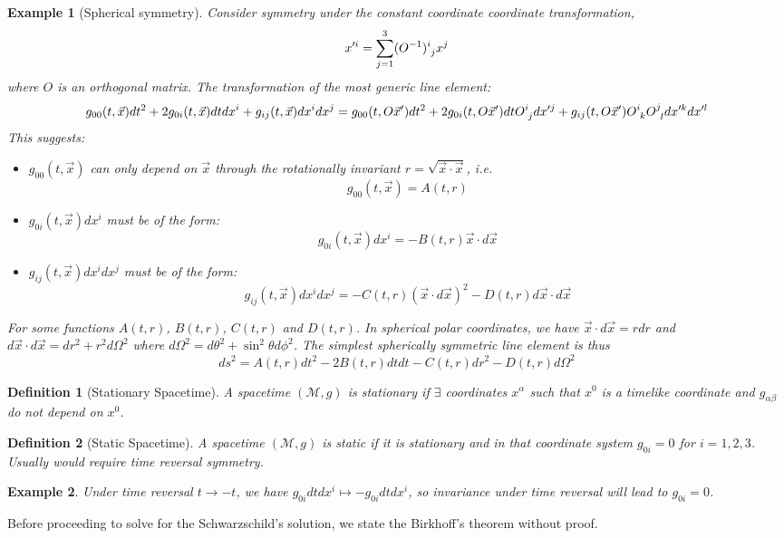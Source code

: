 \documentclass[a4paper]{article}
\newtheorem{eg}{Example}[section]
\theoremstyle{new}
\newtheorem{defi}{Definition}[section]
\begin{document}
\begin{eg}[Spherical symmetry]
Consider symmetry under the constant coordinate coordinate transformation,
$$x'^i=\sum_{j=1}^3\tensor*{(O^{-1})}{*_{}^{i}_{j}}x^j$$
where $O$ is an orthogonal matrix. The transformation of the most generic line element:
$$g_{00}(t,\vec{x})dt^2+2g_{0i}(t,\vec{x})dt dx^i+g_{ij}(t,\vec{x})dx^idx^j= g_{00}(t,O\vec{x}')dt^2+2g_{0i}(t,O\vec{x}')dt\tensor*{O}{*_{}^{i}_{j}} dx'^j+g_{ij}(t,O\vec{x}')\tensor*{O}{*_{}^{i}_{k}}\tensor*{O}{*_{}^{j}_{l}}dx'^kdx'^l$$
This suggests:
\begin{itemize}
    \item $g_{00}(t,\vec{x})$ can only depend on $\vec{x}$ through the rotationally invariant $r=\sqrt{\vec{x}\cdot\vec{x}}$, i.e.
    $$g_{00}(t,\vec{x})=A(t,r)$$
    \item $g_{0i}(t,\vec{x})dx^i$ must be of the form:
    $$g_{0i}(t,\vec{x})dx^i=-B(t,r)\vec{x}\cdot d\vec{x}$$
    \item $g_{ij}(t,\vec{x})dx^idx^j$ must be of the form:
    $$g_{ij}(t,\vec{x})dx^idx^j=-C(t,r)(\vec{x}\cdot d\vec{x})^2-D(t,r)d\vec{x}\cdot d\vec{x}$$
\end{itemize}
For some functions $A(t,r)$, $B(t,r)$, $C(t,r)$ and $D(t,r)$. In spherical polar coordinates, we have $\vec{x}\cdot d\vec{x}=rdr$ and $d\vec{x}\cdot d\vec{x}=dr^2+r^2d\Omega^2$ where $d\Omega^2=d\theta^2+\sin^2\theta d\phi^2$. The simplest spherically symmetric line element is thus
\begin{equation}
ds^2=A(t,r)dt^2-2B(t,r)dtdt-C(t,r)dr^2-D(t,r)d\Omega^2\label{sphericalsymmetriclineelement}
\end{equation}
\end{eg}
\begin{defi}[Stationary Spacetime]
A spacetime $(\mathcal{M},g)$ is stationary if $\exists$ coordinates $x^\alpha$ such that $x^0$ is a timelike coordinate and $g_{\alpha\beta}$ do not depend on $x^0$.
\end{defi}
\begin{defi}[Static Spacetime]
A spacetime $(\mathcal{M},g)$ is static if it is stationary and in that coordinate system $g_{0i}=0$ for $i=1,2,3$. Usually would require time reversal symmetry.
\end{defi}
\begin{eg}
Under time reversal $t\rightarrow -t$, we have $g_{0i}dtdx^i\mapsto -g_{0i}dtdx^i$, so invariance under time reversal will lead to $g_{0i}=0$.
\end{eg}
Before proceeding to solve for the Schwarzschild's solution, we state the Birkhoff's theorem without proof.
\end{document}
